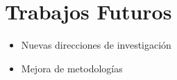 \chapter{Trabajos Futuros} 
\begin{itemize}
    \item Nuevas direcciones de investigación
    \item Mejora de metodologías

\end{itemize}